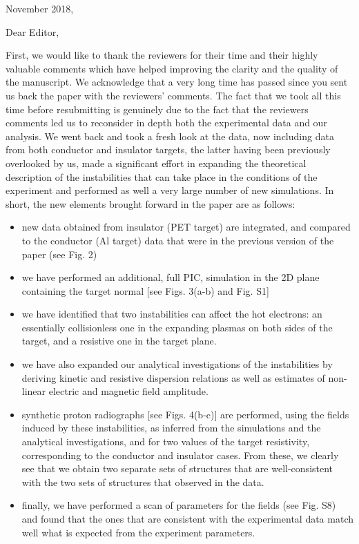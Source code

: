 \documentclass[aps,showpacs,superscriptaddress]{revtex4}%
\begin{document}
November 2018,

Dear Editor,

First, we would like to thank the reviewers for their time and their highly valuable comments which have helped improving the clarity and the quality of the manuscript. We acknowledge that a very long time has passed since you sent us back the paper with the reviewers' comments. 
The fact that we took all this time before resubmitting is genuinely due to the fact that the reviewers comments led us to reconsider in depth both the experimental data and our analysis. We went back and took a fresh look at the data, now including data from both conductor and insulator targets, the latter having been previously overlooked by us, made a significant effort in expanding the theoretical description of the instabilities that can take place in the conditions of the experiment and performed as well a very large number of new simulations. 
In short, the new elements brought forward in the paper are as follows:
\begin{itemize}
    \item new data obtained from insulator (PET target) are integrated, and compared to the conductor (Al target) data that were in the previous version of the paper (see Fig. 2)
    \item we have performed an additional, full PIC, simulation in the 2D plane containing the target normal [see Figs. 3(a-b) and Fig. S1]
    \item we have identified that two instabilities can affect the hot electrons: an essentially  collisionless one in the expanding plasmas on both sides of the target, and a resistive one in the target plane. 
    \item we have also expanded our analytical investigations of the instabilities by deriving kinetic and resistive dispersion relations as well as  estimates of    non-linear electric and magnetic field amplitude.
    \item synthetic proton radiographs [see Figs. 4(b-c)] are performed, using the fields induced by these instabilities, as inferred from the simulations and the analytical investigations, and for two values of the target resistivity, corresponding to the conductor and insulator cases. From these, we clearly see that we obtain two separate sets of structures that are well-consistent with the two sets of structures that observed in the data. 
    \item finally, we have performed a scan of parameters for the fields (see Fig. S8) and found that the ones that are consistent with the experimental data match well what is expected from the experiment parameters. 
\end{itemize}
\end{document}
